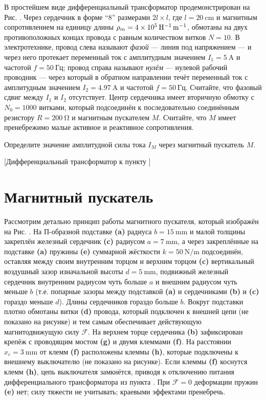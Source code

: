 В простейшем виде дифференциальный трансформатор продемонстрирован на Рис. . Через сердечник в форме ``8'' размерами $2l\times l$, где $l=\qty{20}{\cm}$ и магнитным сопротивлением на единицу длины $\rho_m=\qty{4e5}{\per\H\per\m}$, обмотаны на двух противоположных концах провода с равным количеством витков $N=10$. В электротехнике, провод слева называют \textit{фазой} --- линия под напряжением --- и через него протекает переменный ток с амплитудным значением $I_1=\qty{5}{\A}$ и частотой $f=\qty{50}{Гц}$; провод справа называют \textit{нулём} --- нулевой рабочий проводник --- через который в обратном направлении течёт переменный ток с амплитудным значением $I_2=\qty{4.97}{\A}$ и частотой $f=\qty{50}{Гц}$. Считайте, что фазовый сдвиг между $I_1$ и $I_2$ отсутствует. Центр сердечника имеет вторичную обмотку с $N_0=1000$ витками, который подсоединён к последовательно соединённым резистору $R=\qty{200}{\ohm}$ и магнитным пускателем $M$. Считайте, что $M$ имеет пренебрежимо малые активное и реактивное сопротивления.
\begin{task}
    \item Определите значение амплитудной силы тока $I_M$ через магнитный пускатель $M$.
\end{task}

[Дифференциальный трансформатор к пункту ]

\part{Магнитный пускатель}

Рассмотрим детально принцип работы магнитного пускателя, который изображён на Рис. . На П-образной подставке \textbf{(a)} радиуса $b=\qty{15}{\mm}$ и малой толщины закреплён железный сердечник \textbf{(c)} радиусом $a=\qty{7}{\mm}$, а через закреплённые на подставке \textbf{(a)} пружины \textbf{(e)} суммарной жёсткости $k=\qty{50}{\N\per\m}$ подсоединён, оставляя между своим внутренним торцом и верхним торцом \textbf{(c)} вертикальный воздушный зазор изначальной высоты $d=\qty{5}{\mm}$, подвижный железный сердечник внутренним радиусом чуть больше $a$ и внешним радиусом чуть меньше $b$ (т.е. попарные зазоры между подставкой \textbf{(a)} и сердечниками \textbf{(b)} и \textbf{(c)} гораздо меньше $d$). Длины сердечников гораздо больше $b$. Вокруг подставки плотно обмотаны витки \textbf{(d)} провода, который подключен к внешней цепи (не показано на рисунке) и тем самым обеспечивает действующую магнитодвижущую силу $\mathcal F$. На верхнем торце сердечника \textbf{(b)} зафиксирован крепёж с проводящим мостом \textbf{(g)} и двумя клеммами \textbf{(f)}. На расстоянии $x_c=\qty{3}{\mm}$ от клемм \textbf{(f)} расположены клеммы \textbf{(h)}, которые подключены к внешнему выключателю (не показано на рисунке). Если клеммы \textbf{(f)} коснутся клемм \textbf{(h)}, цепь выключателя замкнётся, приводя к отключению питания дифференциального трансформатора из пункта . При $\mathcal F=0$ деформации пружин \textbf{(e)} нет; силу тяжести не учитывать; краевыми эффектами пренебречь.

